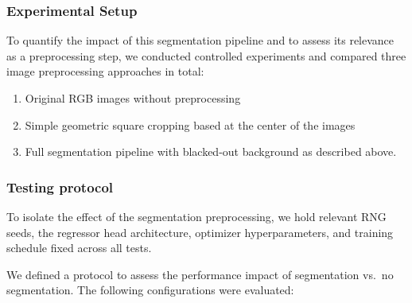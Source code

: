 \documentclass[a4paper]{article}
\begin{document}
        
        \subsubsection{Experimental Setup}
        To quantify the impact of this segmentation pipeline and to assess its relevance as a preprocessing step, we conducted controlled experiments and compared three image preprocessing approaches in total:
        \begin{enumerate}
            \item Original RGB images without preprocessing
            \item Simple geometric square cropping based at the center of the images
            \item Full segmentation pipeline with blacked-out background as described above.
        \end{enumerate}
                
        
        \subsubsection{Testing protocol}
            To isolate the effect of the segmentation preprocessing, we hold relevant RNG seeds, the regressor head architecture, optimizer hyperparameters, and training schedule fixed across all tests.
            
            We defined a protocol to assess the performance impact of segmentation vs.\ no segmentation.
            The following configurations were evaluated:
        
            \begin{table}[h!]
                \centering
                \caption{Segmentation testing protocol matrix}
                \label{tab:seg_test_protocol}
            \end{table}
            
\end{document}
